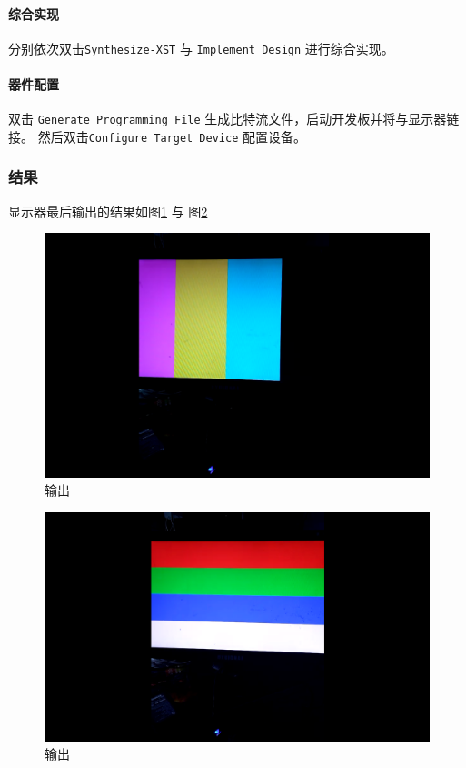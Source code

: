 \documentclass{ctexart}
\begin{document}
            \paragraph{综合实现}
            分别依次双击\verb|Synthesize-XST| 与 \verb|Implement Design| 进行综合实现。
            
            \paragraph{器件配置}
            双击 \verb|Generate Programming File| 生成比特流文件，启动开发板并将与显示器链接。
            然后双击\verb|Configure Target Device| 配置设备。
            
            \subsubsection{结果}
            显示器最后输出的结果如图\ref{fig:report2-vga-scan4} 与 图\ref{fig:report2-vga-scan5}        
            \begin{figure}[h]
\centering
\includegraphics[width=1\linewidth]{report2-vga-scan4}
\caption{输出}
\label{fig:report2-vga-scan4}
\end{figure}
\begin{figure}[h]
\centering
\includegraphics[width=1\linewidth]{report2-vga-scan5}
\caption{输出}
\label{fig:report2-vga-scan5}
\end{figure}
\end{document}
